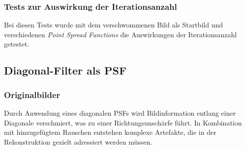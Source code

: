 \subsubsection{Tests zur Auswirkung der Iterationsanzahl}

Bei diesen Tests wurde mit dem verschwommenen Bild als Startbild und verschiedenen \textit{Point Spread Functions} die Auswirkungen der Iterationsanzahl getestet.

\noindent
\begin{minipage}[t]{0.33\textwidth}
\end{minipage}
%
\begin{minipage}[t]{0.33\textwidth}
\end{minipage}
%
\begin{minipage}[t]{0.33\textwidth}
\end{minipage}




\subsection{Diagonal-Filter als PSF}

\subsubsection{Originalbilder}

Durch Anwendung eines diagonalen PSFs wird Bildinformation entlang einer Diagonale verschmiert, was zu einer Richtungsunschärfe führt. In Kombination mit hinzugefügtem Rauschen entstehen komplexe Artefakte, die in der Rekonstruktion gezielt adressiert werden müssen.

\noindent
\begin{minipage}[t]{0.33\textwidth}
\end{minipage}
%
\begin{minipage}[t]{0.33\textwidth}
\end{minipage}
%
\begin{minipage}[t]{0.33\textwidth}
\end{minipage}


